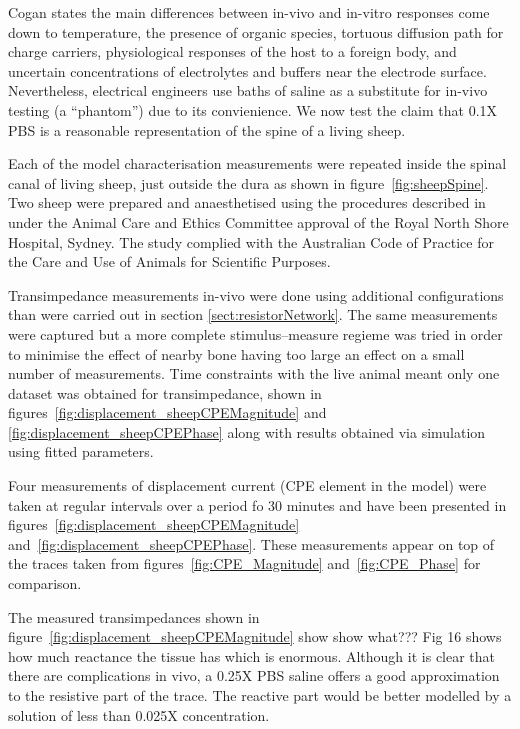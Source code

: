 \documentclass[journal, a4paper]{IEEEtran}
\begin{document}
Cogan states the main differences between in-vivo and in-vitro responses come down to temperature, the presence of organic species, tortuous diffusion path for charge carriers, physiological responses of the host to a foreign body, and uncertain concentrations of electrolytes and buffers near the electrode surface.\cite{Cogan2008}
Nevertheless, electrical engineers use baths of saline as a substitute for in-vivo testing (a ``phantom'') due to its convienience.
We now test the claim that 0.1X PBS is a reasonable representation of the spine of a living sheep.

{\color{blue} Each of the model characterisation} measurements were repeated inside the spinal canal of living sheep, just outside the dura as shown in figure~\ref{fig:sheepSpine}. Two sheep were prepared and anaesthetised using the procedures described in \cite{Parker2013} under the Animal Care and Ethics Committee approval of the Royal North Shore Hospital, Sydney. The study complied with the Australian Code of Practice for the Care and Use of Animals for Scientific Purposes.

{
    \color{blue}
    Transimpedance measurements in-vivo were done using additional configurations than were carried out in section \ref{sect:resistorNetwork}. The same measurements were captured but a more complete stimulus--measure regieme was tried in order to minimise the effect of nearby bone having too large an effect on a small number of measurements. Time constraints with the live animal meant only one dataset was obtained for transimpedance, shown in figures~\ref{fig:displacement_sheepCPEMagnitude} and \ref{fig:displacement_sheepCPEPhase} along with results obtained via simulation using fitted parameters.
}

{\color{blue}
    Four measurements of displacement current (CPE element in the model) were} taken at regular intervals over a period fo 30 minutes and have been presented in figures~\ref{fig:displacement_sheepCPEMagnitude} and~\ref{fig:displacement_sheepCPEPhase}.
{\color{blue} These measurements appear on top of the traces taken from figures~\ref{fig:CPE_Magnitude} and~\ref{fig:CPE_Phase} for comparison.}

{
    \color{blue}
    The measured transimpedances shown in figure~\ref{fig:displacement_sheepCPEMagnitude} show {\color{red} show what??? Fig 16 shows how much reactance the tissue has which is enormous.} 
}
Although it is clear that there are complications in vivo, a 0.25X PBS saline offers a good approximation to the resistive part of the trace.
The reactive part would be better modelled by a solution of less than 0.025X concentration.
\end{document}
